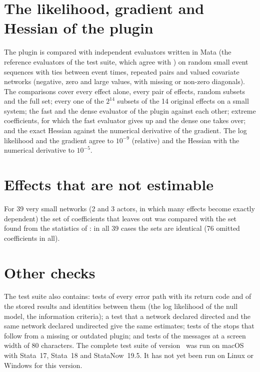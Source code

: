 \section{The likelihood, gradient and Hessian of the plugin}\label{sec:val-plugin}

The plugin is compared with independent evaluators written in Mata (the reference evaluators of the test suite, which agree with \relevent{}) on random small event sequences with ties between event times, repeated pairs and valued covariate networks (negative, zero and large values, with missing or non-zero diagonals). The comparisons cover every effect alone, every pair of effects, random subsets and the full set; every one of the $2^{14}$ subsets of the 14 original effects on a small system; the fast and the dense evaluator of the plugin against each other; extreme coefficients, for which the fast evaluator gives up and the dense one takes over; and the exact Hessian against the numerical derivative of the gradient. The log likelihood and the gradient agree to $10^{-9}$ (relative) and the Hessian with the numerical derivative to $10^{-5}$.

\section{Effects that are not estimable}\label{sec:val-collinear}

For 39 very small networks (2 and 3 actors, in which many effects become exactly dependent) the set of coefficients that \nwrem{} leaves out was compared with the set found from the statistics of \relevent{}: in all 39 cases the sets are identical (76 omitted coefficients in all).

\section{Other checks}

The test suite also contains: tests of every error path with its return code and of the stored results and identities between them (the log likelihood of the null model, the information criteria); a test that a network declared directed and the same network declared undirected give the same estimates; tests of the stops that follow from a missing or outdated plugin; and tests of the messages at a screen width of 80 characters. The complete test suite of version~\pkgversion{} was run on macOS with Stata~17, Stata~18 and StataNow~19.5. It has not yet been run on Linux or Windows for this version. %
